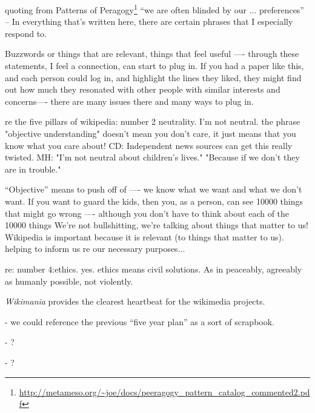  quoting from Patterns of
Peragogy\footnote{\url{http://metameso.org/~joe/docs/peeragogy_pattern_catalog_commented2.pdf}}
``we are often blinded by our ... preferences'' -- In everything
that's written here, there are certain phrases that I especially
respond to.

Buzzwords or things that are relevant, things that feel useful ----
through these statements, I feel a connection, can start to plug in.
If you had a paper like this, and each person could log in, and
highlight the lines they liked, they might find out how much they
resonated with other people with similar interests and concerns----
there are many issues there and many ways to plug in.

re the five pillars of wikipedia: number 2 neutrality. I'm not
neutral. the phrase "objective understanding" doesn't mean you don't
care, it just means that you know what you care about!  CD:
Independent news sources can get this really twisted.  MH: "I'm not
neutral about children's lives."  "Because if we don't they are in
trouble."

``Objective'' means to push off of ---- we know what we want and what
we don't want.  If you want to guard the kids, then you, as a person,
can see 10000 things that might go wrong ---- although you don't have
to think about each of the 10000 things We're not bullshitting, we're
talking about things that matter to us!  Wikipedia is important
because it is relevant (to things that matter to us).  helping to
inform us re our necessary purposes...

re: number 4:ethics. yes. ethics means civil solutions. As in
peaceably, agreeably as humanly possible, not violently.
 
 \emph{Wikimania} provides the clearest
heartbeat for the wikimedia projects.

 - we could reference the previous ``five year
plan'' as a sort of scrapbook.

 - ?

 - ?

